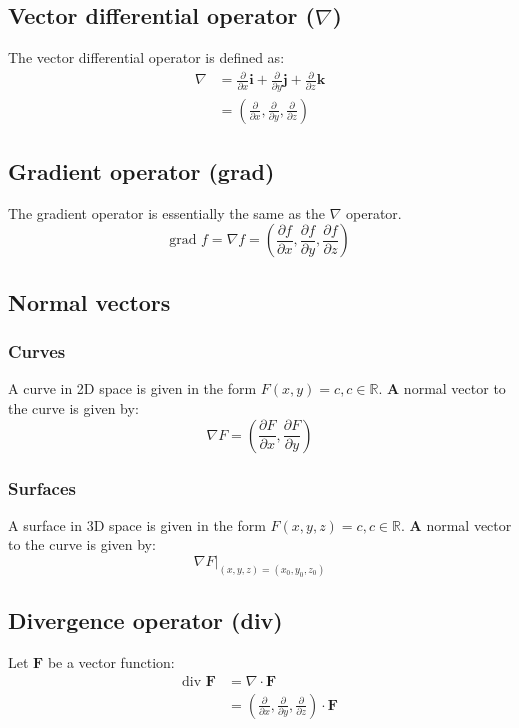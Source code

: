 \documentclass[11pt]{article}
\begin{document}
\subsection{Vector differential operator (\(\nabla\))}
\label{sec:orge2d94fe}
The vector differential operator is defined as:
\begin{align*}
\nabla &= \frac{\partial}{\partial x} \boldsymbol{i} + \frac{\partial}{\partial y} \boldsymbol{j} + \frac{\partial}{\partial z} \boldsymbol{k} \\
&= \left(\frac{\partial}{\partial x}, \frac{\partial}{\partial y}, \frac{\partial}{\partial z} \right)
\end{align*}

\subsection{Gradient operator (grad)}
\label{sec:orga2b3c9e}
The gradient operator is essentially the same as the \(\nabla\) operator.
\[\text{grad } f = \nabla f = \left(\frac{\partial f}{\partial x}, \frac{\partial f}{\partial y}, \frac{\partial f}{\partial z} \right)\]

\subsection{Normal vectors}
\label{sec:org82fece5}

\subsubsection{Curves}
\label{sec:org6f1ed1b}
A curve in 2D space is given in the form \(F(x, y) = c, c \in \mathbb{R}\). \textbf{A} normal vector to the curve is given by:
\[\nabla F = \left(\frac{\partial F}{\partial x}, \frac{\partial F}{\partial y} \right)\]

\subsubsection{Surfaces}
\label{sec:orgf2a49fa}
A surface in 3D space is given in the form \(F(x, y, z) = c, c \in \mathbb{R}\). \textbf{A} normal vector to the curve is given by:
\[\left. \nabla F \right|_{(x, y, z) = (x_0, y_0, z_0)}\]

\subsection{Divergence operator (div)}
\label{sec:orgdc1ace2}
Let \(\boldsymbol{F}\) be a vector function:
\begin{align*}
\text{div } \boldsymbol{F} &= \nabla \cdot \boldsymbol{F} \\
&= \left(\frac{\partial}{\partial x}, \frac{\partial}{\partial y}, \frac{\partial}{\partial z} \right) \cdot \boldsymbol{F}
\end{align*}
\end{document}
